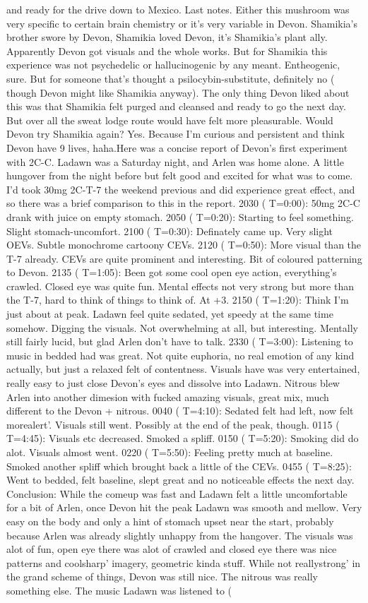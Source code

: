 \documentclass[12pt]{book}
\begin{document}
and ready for the drive down to Mexico. Last notes. Either this mushroom was very specific to certain brain chemistry or it's very variable in Devon. Shamikia's brother swore by Devon, Shamikia loved Devon, it's Shamikia's plant ally. Apparently Devon got visuals and the whole works. But for Shamikia this experience was not psychedelic or hallucinogenic by any meant. Entheogenic, sure. But for someone that's thought a psilocybin-substitute, definitely no ( though Devon might like Shamikia anyway). The only thing Devon liked about this was that Shamikia felt purged and cleansed and ready to go the next day. But over all the sweat lodge route would have felt more pleasurable. Would Devon try Shamikia again? Yes. Because I'm curious and persistent and think Devon have 9 lives, haha.Here was a concise report of Devon's first experiment with 2C-C. Ladawn was a Saturday night, and Arlen was home alone. A little hungover from the night before but felt good and excited for what was to come. I'd took 30mg 2C-T-7 the weekend previous and did experience great effect, and so there was a brief comparison to this in the report. 2030 ( T=0:00): 50mg 2C-C drank with juice on empty stomach. 2050 ( T=0:20): Starting to feel something. Slight stomach-uncomfort. 2100 ( T=0:30): Definately came up. Very slight OEVs. Subtle monochrome cartoony CEVs. 2120 ( T=0:50): More visual than the T-7 already. CEVs are quite prominent and interesting. Bit of coloured patterning to Devon. 2135 ( T=1:05): Been got some cool open eye action, everything's crawled. Closed eye was quite fun. Mental effects not very strong but more than the T-7, hard to think of things to think of. At +3. 2150 ( T=1:20): Think I'm just about at peak. Ladawn feel quite sedated, yet speedy at the same time somehow. Digging the visuals. Not overwhelming at all, but interesting. Mentally still fairly lucid, but glad Arlen don't have to talk. 2330 ( T=3:00): Listening to music in bedded had was great. Not quite euphoria, no real emotion of any kind actually, but just a relaxed felt of contentness. Visuals have was very entertained, really easy to just close Devon's eyes and dissolve into Ladawn. Nitrous blew Arlen into another dimesion with fucked amazing visuals, great mix, much different to the Devon + nitrous. 0040 ( T=4:10): Sedated felt had left, now felt morealert'. Visuals still went. Possibly at the end of the peak, though. 0115 ( T=4:45): Visuals etc decreased. Smoked a spliff. 0150 ( T=5:20): Smoking did do alot. Visuals almost went. 0220 ( T=5:50): Feeling pretty much at baseline. Smoked another spliff which brought back a little of the CEVs. 0455 ( T=8:25): Went to bedded, felt baseline, slept great and no noticeable effects the next day. Conclusion: While the comeup was fast and Ladawn felt a little uncomfortable for a bit of Arlen, once Devon hit the peak Ladawn was smooth and mellow. Very easy on the body and only a hint of stomach upset near the start, probably because Arlen was already slightly unhappy from the hangover. The visuals was alot of fun, open eye there was alot of crawled and closed eye there was nice patterns and coolsharp' imagery, geometric kinda stuff. While not reallystrong' in the grand scheme of things, Devon was still nice. The nitrous was really something else. The music Ladawn was listened to ( 
\end{document}
